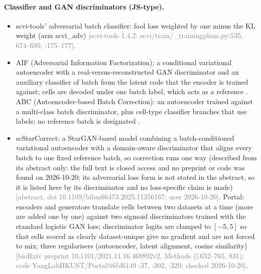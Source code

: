 \documentclass[11pt]{article}
\newcommand{\src}[1]{{\scriptsize\textcolor{gray}{[#1]}}}
\begin{document}
\paragraph{Classifier and GAN discriminators (JS-type).}
\begin{itemize}
\item scvi-tools' adversarial batch classifier: fool loss weighted by one minus the KL weight (arm scvi\_adv) \src{scvi-tools 1.4.2: scvi/train/\_trainingplans.py:535, 674--695; \file{scvi_adversarial_plan.py}:175--177}.
\item AIF (Adversarial Information Factorization): a conditional variational autoencoder with a real-versus-reconstructed GAN discriminator and an auxiliary classifier of batch from the latent code that the encoder is trained against; cells are decoded under one batch label, which acts as a reference \citep{monnier2024novel}. ABC (Autoencoder-based Batch Correction): an autoencoder trained against a multi-class batch discriminator, plus cell-type classifier branches that use labels; no reference batch is designated \citep{danino2024batch}.
\item scStarCorrect: a StarGAN-based model combining a batch-conditioned variational autoencoder with a domain-aware discriminator that aligns every batch to one fixed reference batch, so correction runs one way \citep{gu2025scstarcorrect} (described from its abstract only: the full text is closed access and no preprint or code was found on 2026-10-20; its adversarial loss form is not stated in the abstract, so it is listed here by its discriminator and no loss-specific claim is made) \src{abstract, doi 10.1109/bibm66473.2025.11356167; user 2026-10-20}. Portal: encoders and generators translate cells between two datasets at a time (more are added one by one) against two sigmoid discriminators trained with the standard logistic GAN loss; discriminator logits are clamped to $[-5, 5]$ so that cells scored as clearly dataset-unique give no gradient and are not forced to mix; three regularisers (autoencoder, latent alignment, cosine similarity) \citep{zhao2022adversarial} \src{bioRxiv preprint 10.1101/2021.11.16.468892v2, Methods (l.652--765, 831); code YangLabHKUST/Portal@6bf6149 \file{portal/model.py}:37, :302, :329; checked 2026-10-20}.
\end{itemize}
\end{document}
